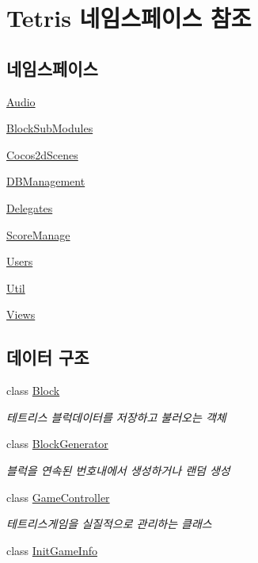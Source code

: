 \hypertarget{namespace_tetris}{}\section{Tetris 네임스페이스 참조}
\label{namespace_tetris}
\subsection*{네임스페이스}
\begin{DoxyCompactItemize}
\item 
 \hyperlink{namespace_tetris_1_1_audio}{Audio}
\item 
 \hyperlink{namespace_tetris_1_1_block_sub_modules}{Block\+Sub\+Modules}
\item 
 \hyperlink{namespace_tetris_1_1_cocos2d_scenes}{Cocos2d\+Scenes}
\item 
 \hyperlink{namespace_tetris_1_1_d_b_management}{D\+B\+Management}
\item 
 \hyperlink{namespace_tetris_1_1_delegates}{Delegates}
\item 
 \hyperlink{namespace_tetris_1_1_score_manage}{Score\+Manage}
\item 
 \hyperlink{namespace_tetris_1_1_users}{Users}
\item 
 \hyperlink{namespace_tetris_1_1_util}{Util}
\item 
 \hyperlink{namespace_tetris_1_1_views}{Views}
\end{DoxyCompactItemize}
\subsection*{데이터 구조}
\begin{DoxyCompactItemize}
\item 
class \hyperlink{class_tetris_1_1_block}{Block}
\begin{DoxyCompactList}\small\item\em 테트리스 블럭데이터를 저장하고 불러오는 객체 \end{DoxyCompactList}\item 
class \hyperlink{class_tetris_1_1_block_generator}{Block\+Generator}
\begin{DoxyCompactList}\small\item\em 블럭을 연속된 번호내에서 생성하거나 랜덤 생성 \end{DoxyCompactList}\item 
class \hyperlink{class_tetris_1_1_game_controller}{Game\+Controller}
\begin{DoxyCompactList}\small\item\em 테트리스게임을 실질적으로 관리하는 클래스 \end{DoxyCompactList}\item 
class \hyperlink{class_tetris_1_1_init_game_info}{Init\+Game\+Info}
\end{DoxyCompactItemize}
